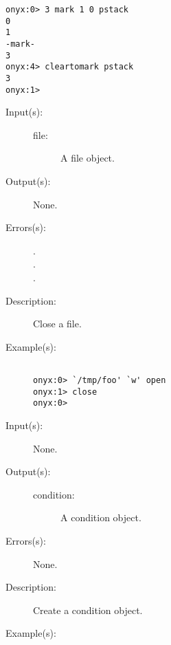 \begin{description}
\begin{description}
\begin{verbatim}
onyx:0> 3 mark 1 0 pstack
0
1
-mark-
3
onyx:4> cleartomark pstack
3
onyx:1>
		\end{verbatim}
	\end{description}
\label{systemdict:close}
\item[{\onyxop{file}{close}{--}}: ]
	\begin{description}\item[]
	\item[Input(s): ]
		\begin{description}\item[]
		\item[file: ]
			A file object.
		\end{description}
	\item[Output(s): ] None.
	\item[Errors(s): ]
		\begin{description}\item[]
		\item[.]
		\item[.]
		\item[.]
		\end{description}
	\item[Description: ]
		Close a file.
	\item[Example(s): ]\begin{verbatim}

onyx:0> `/tmp/foo' `w' open
onyx:1> close
onyx:0>
		\end{verbatim}
	\end{description}
\label{systemdict:condition}
\item[{\onyxop{--}{condition}{condition}}: ]
	\begin{description}\item[]
	\item[Input(s): ] None.
	\item[Output(s): ]
		\begin{description}\item[]
		\item[condition: ]
			A condition object.
		\end{description}
	\item[Errors(s): ] None.
	\item[Description: ]
		Create a condition object.
	\item[Example(s): ]\begin{verbatim}


\end{verbatim}
\end{description}
\end{description}
